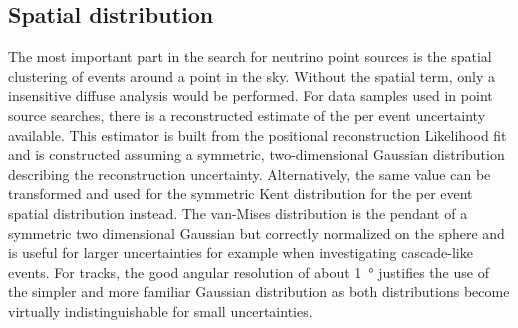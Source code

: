 \subsection{Spatial distribution}
The most important part in the search for neutrino point sources is the spatial clustering of events around a point in the sky.
Without the spatial term, only a insensitive diffuse analysis would be performed.
For data samples used in point source searches, there is a reconstructed estimate of the per event uncertainty available.
This estimator is built from the positional reconstruction Likelihood fit and is constructed assuming a symmetric, two-dimensional Gaussian distribution describing the reconstruction uncertainty.
Alternatively, the same value can be transformed and used for the symmetric Kent distribution  for the per event spatial distribution instead.
The van-Mises distribution is the pendant of a symmetric two dimensional Gaussian but correctly normalized on the sphere and is useful for larger uncertainties for example when investigating cascade-like events.
For tracks, the good angular resolution of about \SI{1}{\degree} justifies the use of the simpler and more familiar Gaussian distribution as both distributions become virtually indistinguishable for small uncertainties.

